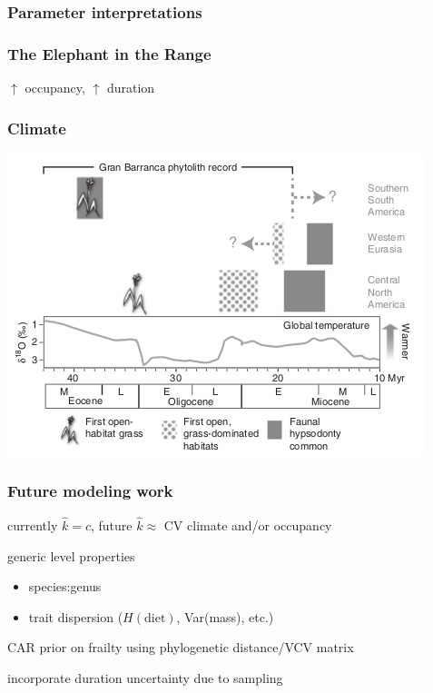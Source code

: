 \documentclass{beamer}
\begin{document}
\begin{frame}
  \frametitle{Parameter interpretations}

\end{frame}

\begin{frame}
  \frametitle{The Elephant in the Range}


  \(\uparrow\) occupancy, \(\uparrow\) duration

\end{frame}

\begin{frame}
  \frametitle{Climate}

  \includegraphics[height=0.8\textheight,width=\textwidth,keepaspectratio=true]{figure/stromberg}

  \tiny{}
\end{frame}

\begin{frame}
  \frametitle{Future modeling work}

  currently \(\hat{k} = c\), future \(\hat{k} \approx\) CV climate and/or occupancy

  generic level properties 
  \begin{itemize}
    \item species:genus
    \item trait dispersion (\(H(\text{diet})\), Var(mass), etc.)
  \end{itemize}

  CAR prior on frailty using phylogenetic distance/VCV matrix

  incorporate duration uncertainty due to sampling 

\end{frame}
\end{document}
